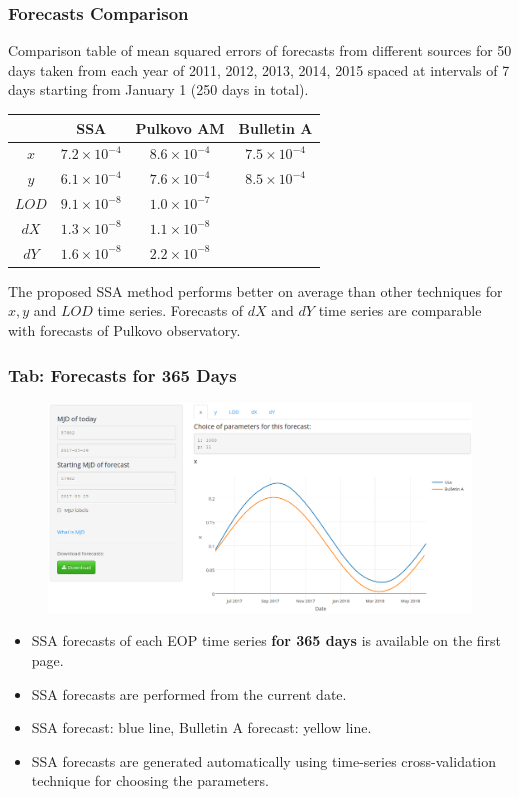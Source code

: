\documentclass[pdf, unicode, notheorems, xcolor={table}]{beamer}
\begin{document}
\begin{frame}\frametitle{Forecasts Comparison}
	Comparison table of mean squared errors of forecasts from different sources for 50 days taken from each year of 2011, 2012, 2013, 2014, 2015 spaced at intervals of 7 days starting from January 1 (250 days in total).
	\begin{table}[!hhh]
		\centering
		\small
		\begin{tabular}{|c|c|c|c|}
			\hline
			& SSA & Pulkovo AM & Bulletin A \\
			\hline
			$ x $   & \cellcolor{blue!25} $ 7.2 \times 10^{-4} $ & $ 8.6 \times 10^{-4} $ & $ 7.5 \times 10^{-4} $  \\
			\hline
			$ y $   & \cellcolor{blue!25} $ 6.1 \times 10^{-4} $ & $ 7.6 \times 10^{-4} $ & $ 8.5 \times 10^{-4} $ \\
			\hline
			$ LOD $ & \cellcolor{blue!25} $ 9.1 \times 10^{-8} $ & $ 1.0 \times 10^{-7} $ &  \\
			\hline
			$ dX $  & $ 1.3 \times 10^{-8} $ & \cellcolor{blue!25} $ 1.1 \times 10^{-8} $ &  \\
			\hline
			$ dY $  & \cellcolor{blue!25} $ 1.6 \times 10^{-8} $ & $ 2.2 \times 10^{-8} $ &  \\
			\hline
		\end{tabular}
	\end{table}

	The proposed SSA method performs better on average than other techniques for $ x, y $ and $ LOD $ time series. Forecasts of $ dX $ and $ dY $ time series are comparable with forecasts of Pulkovo observatory.
\end{frame}


\begin{frame}\frametitle{Tab: Forecasts for 365 Days}
	\begin{figure}
		\includegraphics[width=0.9 \linewidth]{forecast_365}
	\end{figure}
	\begin{itemize}
		\item SSA forecasts of each EOP time series \textbf{for 365 days} is available on the first page.
		\item SSA forecasts are performed from the current date.
		\item SSA forecast: blue line, Bulletin A forecast: yellow line.
		\item SSA forecasts are generated automatically using time-series cross-validation technique for choosing the parameters.
	\end{itemize}
\end{frame}
\end{document}
